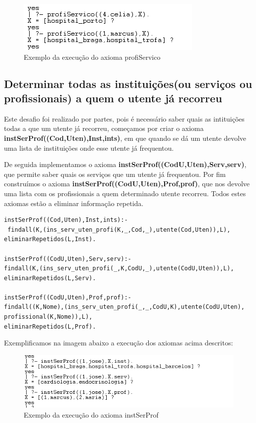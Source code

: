 \begin{figure}[<+htpb+>]
	\centering
	\includegraphics[scale=0.9]{answer7.png}
	\caption{Exemplo da execução do axioma profiServico}
	\label{p3:fig:output7}
\end{figure}

\subsection{Determinar todas as instituições(ou serviços ou profissionais) a quem o utente já recorreu}

Este desafio foi realizado por partes, pois é necessário saber quais as intituições todas a que um utente já recorreu, começamos por criar o axioma \textbf{instSerProf((Cod,Uten),Inst,ints)}, em que quando se dá um utente devolve uma lista de instituições onde esse utente já frequentou. 

De seguida implementamos o axioma \textbf{instSerProf((CodU,Uten),Serv,serv)}, que permite saber quais os serviços que um utente já frequentou. 
Por fim construímos o axioma \textbf{instSerProf((CodU,Uten),Prof,prof)}, que nos devolve uma lista com os profissionais a quem determinado utente recorreu. Todos estes axiomas estão a eliminar informação repetida. 

\begin{verbatim}
instSerProf((Cod,Uten),Inst,ints):-
 findall(K,(ins_serv_uten_profi(K,_,Cod,_),utente(Cod,Uten)),L),
eliminarRepetidos(L,Inst).

instSerProf((CodU,Uten),Serv,serv):-
findall(K,(ins_serv_uten_profi(_,K,CodU,_),utente(CodU,Uten)),L),
eliminarRepetidos(L,Serv).

instSerProf((CodU,Uten),Prof,prof):-
findall((K,Nome),(ins_serv_uten_profi(_,_,CodU,K),utente(CodU,Uten),
profissional(K,Nome)),L),
eliminarRepetidos(L,Prof).
\end{verbatim}

Exemplificamos na imagem abaixo a execução dos axiomas acima descritos: 

\begin{figure}[<+htpb+>]
	\centering
	\includegraphics[scale=0.9]{answer8.png}
	\caption{Exemplo da execução do axioma instSerProf}
	\label{p3:fig:output8}
\end{figure}


